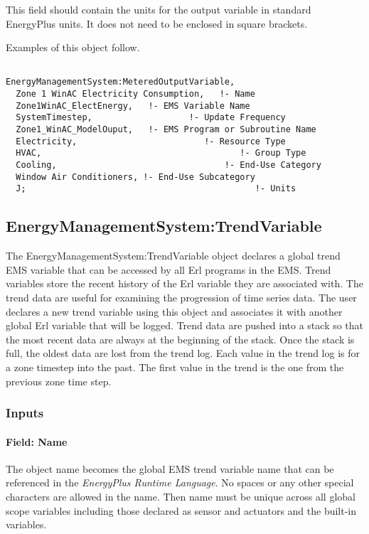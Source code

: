 This field should contain the units for the output variable in standard EnergyPlus units. It does not need to be enclosed in square brackets.

Examples of this object follow.

\begin{lstlisting}

EnergyManagementSystem:MeteredOutputVariable,
  Zone 1 WinAC Electricity Consumption,   !- Name
  Zone1WinAC_ElectEnergy,   !- EMS Variable Name
  SystemTimestep,                   !- Update Frequency
  Zone1_WinAC_ModelOuput,   !- EMS Program or Subroutine Name
  Electricity,                         !- Resource Type
  HVAC,                                       !- Group Type
  Cooling,                                 !- End-Use Category
  Window Air Conditioners, !- End-Use Subcategory
  J;                                             !- Units
\end{lstlisting}

\subsection{EnergyManagementSystem:TrendVariable}\label{energymanagementsystemtrendvariable}

The EnergyManagementSystem:TrendVariable object declares a global trend EMS variable that can be accessed by all Erl programs in the EMS. Trend variables store the recent history of the Erl variable they are associated with. The trend data are useful for examining the progression of time series data. The user declares a new trend variable using this object and associates it with another global Erl variable that will be logged. Trend data are pushed into a stack so that the most recent data are always at the beginning of the stack. Once the stack is full, the oldest data are lost from the trend log. Each value in the trend log is for a zone timestep into the past. The first value in the trend is the one from the previous zone time step.

\subsubsection{Inputs}\label{inputs-7-008}

\paragraph{Field: Name}\label{field-name-7-005}

The object name becomes the global EMS trend variable name that can be referenced in the \emph{EnergyPlus Runtime Language}. No spaces or any other special characters are allowed in the name. Then name must be unique across all global scope variables including those declared as sensor and actuators and the built-in variables.


